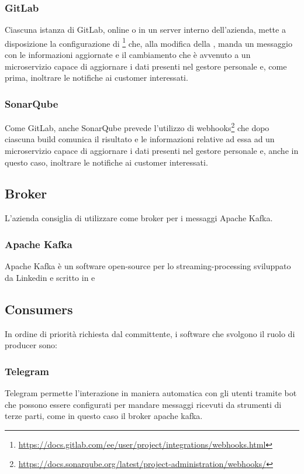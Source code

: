 		\subsubsection{GitLab}
		Ciascuna istanza di GitLab, online o in un server interno dell'azienda, mette a disposizione la configurazione di \footnote{\url{https://docs.gitlab.com/ee/user/project/integrations/webhooks.html}} che, alla modifica della , manda un messaggio con le informazioni aggiornate e il cambiamento che è avvenuto a un microservizio capace di aggiornare i dati presenti nel gestore personale e, come prima, inoltrare le notifiche ai customer interessati.
		
		\subsubsection{SonarQube}
		Come GitLab, anche SonarQube prevede l'utilizzo di webhooks\footnote{\url{https://docs.sonarqube.org/latest/project-administration/webhooks/}} che dopo ciascuna build comunica il risultato e le informazioni relative ad essa ad un microservizio capace di aggiornare i dati presenti nel gestore personale e, anche in questo caso, inoltrare le notifiche ai customer interessati.
		
	\subsection{Broker}
	
		L'azienda consiglia di utilizzare come broker per i messaggi Apache Kafka.
	
		\subsubsection{Apache Kafka}
		Apache Kafka è un software open-source per lo streaming-processing sviluppato da Linkedin e scritto in  e 
		
	
	\subsection{Consumers}
	
		In ordine di priorità richiesta dal committente, i software che svolgono il ruolo di producer sono:
	
		\subsubsection{Telegram}
		Telegram permette l'interazione in maniera automatica con gli utenti tramite bot che possono essere configurati per mandare messaggi ricevuti da strumenti di terze parti, come in questo caso il broker apache kafka.
		
